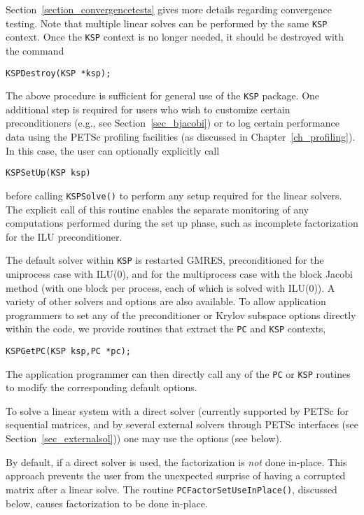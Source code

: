 Section~\ref{section_convergencetests} gives more details regarding
convergence testing. Note that multiple linear solves can be performed by
the same \lstinline{KSP} context. Once the \lstinline{KSP} context is no longer needed, it should be
destroyed with the command
\begin{lstlisting}
KSPDestroy(KSP *ksp);
\end{lstlisting}

The above procedure is sufficient for general use of the \lstinline{KSP} package.
One additional step is required for users who wish to customize certain
preconditioners (e.g., see Section~\ref{sec_bjacobi}) or to log certain
performance data using the PETSc profiling facilities (as discussed in
Chapter~\ref{ch_profiling}).
In this case, the user can optionally explicitly call
\begin{lstlisting}
KSPSetUp(KSP ksp)
\end{lstlisting}
before calling \lstinline{KSPSolve()} to perform any setup required for
the linear solvers.  The explicit call of this routine enables the
separate monitoring of any computations performed during the set up
phase, such as incomplete factorization for the ILU preconditioner.

The default solver within \lstinline{KSP} is restarted GMRES, preconditioned for
the uniprocess case with ILU(0), and for the multiprocess case
with the block Jacobi method (with one block per process, each of
which is solved with ILU(0)). A variety of other solvers
and options are also available.
To allow application programmers to set any of the preconditioner or
Krylov subspace options directly within the code, we provide routines
that extract the \lstinline{PC} and \lstinline{KSP} contexts,
\begin{lstlisting}
KSPGetPC(KSP ksp,PC *pc);
\end{lstlisting}
The application programmer can then directly call any of the \lstinline{PC} or \lstinline{KSP}
routines to modify the corresponding default options.

To solve a linear system with a direct solver (currently supported
by PETSc for sequential matrices, and by several external solvers through
PETSc interfaces (see Section~\ref{sec_externalsol})) one may use the options
   
(see below).

By default, if a direct solver is used, the factorization is {\em not} done
in-place. This approach prevents the user from the unexpected surprise
of having a corrupted matrix after a linear solve. The routine
\lstinline{PCFactorSetUseInPlace()}, discussed below, causes factorization to
be done in-place.

